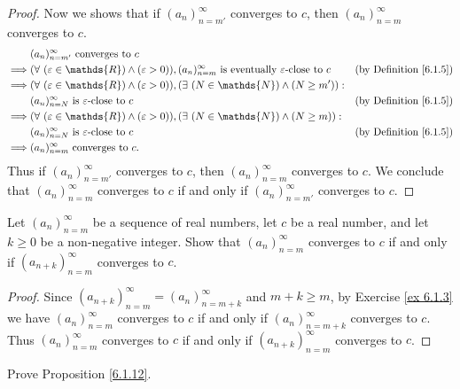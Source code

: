 \begin{proof}
Now we shows that if \((a_n)_{n = m'}^\infty\) converges to \(c\), then \((a_n)_{n = m}^\infty\) converges to \(c\).
\begin{align*}
& (a_n)_{n = m'}^\infty \text{ converges to } c \\
\implies & (\forall\ (\varepsilon \in \mathds{R}) \land (\varepsilon > 0)), (a_n)_{n = m}^\infty \text{ is eventually } \varepsilon\text{-close to } c & \text{(by Definition \ref{6.1.5})} \\
\implies & (\forall\ (\varepsilon \in \mathds{R}) \land (\varepsilon > 0)), (\exists\ (N \in \mathds{N}) \land (N \geq m')) : \\
& (a_n)_{n = N}^\infty \text{ is } \varepsilon\text{-close to } c & \text{(by Definition \ref{6.1.5})} \\
\implies & (\forall\ (\varepsilon \in \mathds{R}) \land (\varepsilon > 0)), (\exists\ (N \in \mathds{N}) \land (N \geq m)) : \\
& (a_n)_{n = N}^\infty \text{ is } \varepsilon\text{-close to } c & \text{(by Definition \ref{6.1.5})} \\
\implies & (a_n)_{n = m}^\infty \text{ converges to } c.
\end{align*}
Thus if \((a_n)_{n = m'}^\infty\) converges to \(c\), then \((a_n)_{n = m}^\infty\) converges to \(c\).
We conclude that \((a_n)_{n = m}^\infty\) converges to \(c\) if and only if \((a_n)_{n = m'}^\infty\) converges to \(c\).
\end{proof}

\begin{exercise}\label{ex 6.1.4}
Let \((a_n)_{n = m}^\infty\) be a sequence of real numbers, let \(c\) be a real number, and let \(k \geq 0\) be a non-negative integer.
Show that \((a_n)_{n = m}^\infty\) converges to \(c\) if and only if \((a_{n + k})_{n = m}^\infty\) converges to \(c\).
\end{exercise}

\begin{proof}
Since \((a_{n + k})_{n = m}^\infty = (a_n)_{n = m + k}^\infty\) and \(m + k \geq m\), by Exercise \ref{ex 6.1.3} we have \((a_n)_{n = m}^\infty\) converges to \(c\) if and only if \((a_n)_{n = m + k}^\infty\) converges to \(c\).
Thus \((a_n)_{n = m}^\infty\) converges to \(c\) if and only if \((a_{n + k})_{n = m}^\infty\) converges to \(c\).
\end{proof}

\begin{exercise}\label{ex 6.1.5}
Prove Proposition \ref{6.1.12}.
\end{exercise}

